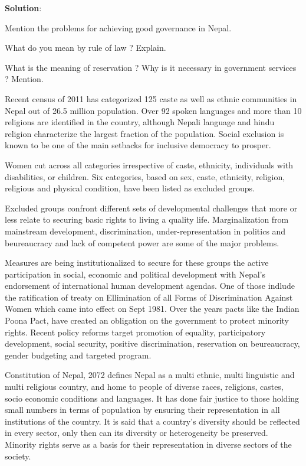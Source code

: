 \documentclass[
  openany]{book}
\newcommand{\question}{\item}
\newenvironment{solution}{ {\bfseries Solution}:}{}
\begin{document}
\begin{questions}
\begin{solution}
\end{solution}

\question Mention the problems for achieving good governance in Nepal.

\question What do you mean by rule of law ? Explain.

\question What is the meaning of reservation ? Why is it necessary in government services ? Mention.

Recent census of 2011 has categorized 125 caste as well as ethnic communities in Nepal out of 26.5 million population. Over 92 spoken languages and more than 10 religions are identified in the country, although Nepali language and hindu religion characterize the largest fraction of the population. Social exclusion is known to be one of the main setbacks for inclusive democracy to prosper.

Women cut across all categories irrespective of caste, ethnicity, individuals with disabilities, or children. Six categories, based on sex, caste, ethnicity, religion, religious and physical condition, have been listed as excluded groups.

Excluded groups confront different sets of developmental challenges that more or less relate to securing basic rights to living a quality life. Marginalization from mainstream development, discrimination, under-representation in politics and beureaucracy and lack of competent power are some of the major problems.

Measures are being institutionalized to secure for these groups the active participation in social, economic and political development with Nepal's endorsement of international human development agendas. One of those indlude the ratification of treaty on Ellimination of all Forms of Discrimination Against Women which came into effect on Sept 1981. Over the years pacts like the Indian Poona Pact, have created an obligation on the government to protect minority rights. Recent policy reforms target promotion of equality, participatory development, social security, positive discrimination, reservation on beureaucracy, gender budgeting and targeted program.

Constitution of Nepal, 2072 defines Nepal as a multi ethnic, multi linguistic and multi religious country, and home to people of diverse races, religions, castes, socio economic conditions and languages. It has done fair justice to those holding small numbers in terms of population by ensuring their representation in all institutions of the country. It is said that a country’s diversity should be reflected in every sector, only then can its diversity or heterogeneity be preserved. Minority rights serve as a basis for their representation in diverse sectors of the society. 


\end{questions}
\end{document}
